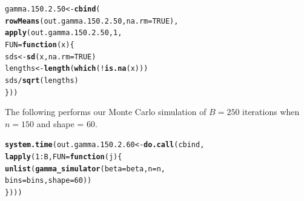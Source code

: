\documentclass[11pt]{article}\usepackage[]{graphicx}\usepackage[]{color}
\makeatletter
\newcommand{\hlnum}[1]{\textcolor[rgb]{0.686,0.059,0.569}{#1}}%
\newcommand{\hlopt}[1]{\textcolor[rgb]{0,0,0}{#1}}%
\newcommand{\hlstd}[1]{\textcolor[rgb]{0.345,0.345,0.345}{#1}}%
\newcommand{\hlkwa}[1]{\textcolor[rgb]{0.161,0.373,0.58}{\textbf{#1}}}%
\newcommand{\hlkwb}[1]{\textcolor[rgb]{0.69,0.353,0.396}{#1}}%
\newcommand{\hlkwc}[1]{\textcolor[rgb]{0.333,0.667,0.333}{#1}}%
\newcommand{\hlkwd}[1]{\textcolor[rgb]{0.737,0.353,0.396}{\textbf{#1}}}%
\newenvironment{kframe}{%
 \def\at@end@of@kframe{}%
 \ifinner\ifhmode%
  \def\at@end@of@kframe{\end{minipage}}%
  \begin{minipage}{\columnwidth}%
 \fi\fi%
 \def\FrameCommand##1{\hskip\@totalleftmargin \hskip-\fboxsep
 \colorbox{shadecolor}{##1}\hskip-\fboxsep
     \hskip-\linewidth \hskip-\@totalleftmargin \hskip\columnwidth}%
 \MakeFramed {\advance\hsize-\width
   \@totalleftmargin\z@ \linewidth\hsize
   \@setminipage}}%
 {\par\unskip\endMakeFramed%
 \at@end@of@kframe}
\newenvironment{knitrout}{}{} %
\makeatother
\begin{document}
\begin{knitrout}
\color{fgcolor}\begin{kframe}
\begin{alltt}
\hlstd{gamma.150.2.50} \hlkwb{<-} \hlkwd{cbind}\hlstd{(}
  \hlkwd{rowMeans}\hlstd{(out.gamma.150.2.50,} \hlkwc{na.rm} \hlstd{=} \hlnum{TRUE}\hlstd{),}
  \hlkwd{apply}\hlstd{(out.gamma.150.2.50,} \hlnum{1}\hlstd{,}
  \hlkwc{FUN} \hlstd{=} \hlkwa{function}\hlstd{(}\hlkwc{x}\hlstd{)\{}
    \hlstd{sds} \hlkwb{<-} \hlkwd{sd}\hlstd{(x,} \hlkwc{na.rm} \hlstd{=} \hlnum{TRUE}\hlstd{)}
    \hlstd{lengths} \hlkwb{<-} \hlkwd{length}\hlstd{(}\hlkwd{which}\hlstd{(}\hlopt{!}\hlkwd{is.na}\hlstd{(x)))}
    \hlstd{sds} \hlopt{/} \hlkwd{sqrt}\hlstd{(lengths)}
  \hlstd{\}))}
\end{alltt}


{\ttfamily\noindent\bfseries\color{errorcolor}{\#\# Error in is.data.frame(x): object 'out.gamma.150.2.50' not found}}\end{kframe}
\end{knitrout}

The following performs our Monte Carlo simulation of $B = 250$ iterations 
when $n = 150$ and shape = $60$.

\begin{knitrout}
\color{fgcolor}\begin{kframe}
\begin{alltt}
\hlkwd{system.time}\hlstd{(out.gamma.150.2.60} \hlkwb{<-} \hlkwd{do.call}\hlstd{(cbind,}
  \hlkwd{lapply}\hlstd{(}\hlnum{1}\hlopt{:}\hlstd{B,} \hlkwc{FUN} \hlstd{=} \hlkwa{function}\hlstd{(}\hlkwc{j}\hlstd{)\{}
    \hlkwd{unlist}\hlstd{(}\hlkwd{gamma_simulator}\hlstd{(}\hlkwc{beta} \hlstd{= beta,} \hlkwc{n} \hlstd{= n,}
      \hlkwc{bins} \hlstd{= bins,} \hlkwc{shape} \hlstd{=} \hlnum{60}\hlstd{))}
\hlstd{\})))}
\end{alltt}


{\ttfamily\noindent\bfseries\color{errorcolor}{\#\# Error in eval(predvars, data, env): object 'x1' not found}}

{\ttfamily\noindent\itshape\color{messagecolor}{\#\# Timing stopped at: 0.004 0 0.004}}\end{kframe}
\end{knitrout}
\end{document}
